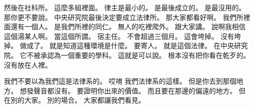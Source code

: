 \hypertarget{c01:cue:3958}{}然後在社科所。
\hypertarget{c01:cue:3959}{}這麼多組裡面。
\hypertarget{c01:cue:3960}{}律主是最小的。
\hypertarget{c01:cue:3961}{}是最後成立的。
\hypertarget{c01:cue:3962}{}是最沒用的。
\hypertarget{c01:cue:3963}{}那你更不要說。
\hypertarget{c01:cue:3964}{}中央研究院最後決定要成立法律所。
\hypertarget{c01:cue:3965}{}那大家都看好啊。
\hypertarget{c01:cue:3966}{}我們所裡面還有一個人。
\hypertarget{c01:cue:3967}{}是我們所裡的同仁。
\hypertarget{c01:cue:3968}{}無人的吃裡爬外。
\hypertarget{c01:cue:3969}{}跟大家講。
\hypertarget{c01:cue:3970}{}說啊我相信這個湯某人啊。
\hypertarget{c01:cue:3971}{}當這個所謂。
\hypertarget{c01:cue:3972}{}宿主任。
\hypertarget{c01:cue:3973}{}不會超過三個月。
\hypertarget{c01:cue:3974}{}這會垮掉。
\hypertarget{c01:cue:3975}{}沒有垮掉。
\hypertarget{c01:cue:3976}{}做成了。
\hypertarget{c01:cue:3977}{}就是知道這種環境是什麼。
\hypertarget{c01:cue:3978}{}要寄人。
\hypertarget{c01:cue:3979}{}就是這個法律。
\hypertarget{c01:cue:3980}{}在中央研究院。
\hypertarget{c01:cue:3981}{}它不被承認為一個重要的學科。
\hypertarget{c01:cue:3982}{}這就是可以說。
\hypertarget{c01:cue:3983}{}根本沒有把你看在乾歹的。
\hypertarget{c01:cue:3984}{}沒有放在人裡。

\hypertarget{c01:cue:3985}{}我們不要以為我們這是法律系的。
\hypertarget{c01:cue:3986}{}哎唷 我們法律系的這樣。
\hypertarget{c01:cue:3987}{}但是你去到那個地方。
\hypertarget{c01:cue:3988}{}想發聲音都沒有。
\hypertarget{c01:cue:3989}{}要證明你出來的價值。
\hypertarget{c01:cue:3990}{}而且要在那邊的偏遠的地方。
\hypertarget{c01:cue:3991}{}但在別的大家。
\hypertarget{c01:cue:3992}{}別的場合。
\hypertarget{c01:cue:3993}{}大家都讓我們看見。

